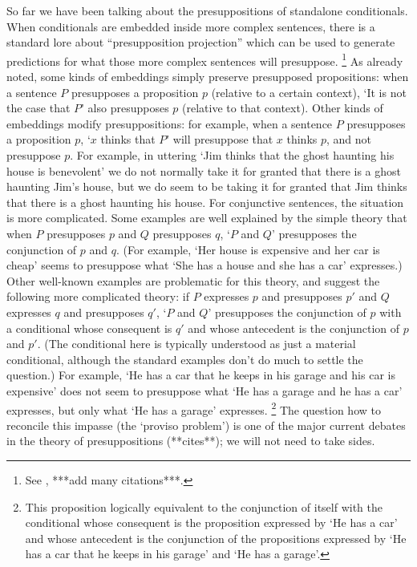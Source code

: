 \documentclass[If.tex]{subfiles}
\begin{document}
So far we have been talking about the presuppositions of standalone conditionals. When conditionals are embedded inside more complex sentences, there is a standard lore about “presupposition projection” which can be used to generate predictions for what those more complex sentences will presuppose.%
\footnote{See \cite{KarttunenPetersCI}, ***add many citations***.} 
As already noted, some kinds of embeddings simply preserve presupposed propositions: when a sentence $P$ presupposes a proposition $p$ (relative to a certain context), ‘It is not the case that $P$’ also presupposes $p$ (relative to that context). Other kinds of embeddings modify presuppositions: for example, when a sentence $P$ presupposes a proposition $p$, ‘$x$ thinks that $P$’ will presuppose that $x$ thinks $p$, and not presuppose $p$.  For example, in uttering ‘Jim thinks that the ghost haunting his house is benevolent’ we do not normally take it for granted that there is a ghost haunting Jim's house, but we do seem to be taking it for granted that Jim thinks that there is a ghost haunting his house.  For conjunctive sentences, the situation is more complicated.  Some examples are well explained by the simple theory that when $P$ presupposes $p$ and $Q$ presupposes $q$, ‘$P$ and $Q$’ presupposes the conjunction of $p$ and $q$.  (For example, ‘Her house is expensive and her car is cheap’ seems to presuppose what ‘She has a house and she has a car’ expresses.)  Other well-known examples are problematic for this theory, and suggest the following more complicated theory: if $P$ expresses $p$ and presupposes $p'$ and $Q$ expresses $q$ and presupposes $q'$, ‘$P$ and $Q$’ presupposes the conjunction of $p$ with a conditional whose consequent is $q'$ and whose antecedent is the conjunction of $p$ and $p'$.  (The conditional here is typically understood as just a material conditional, although the standard examples don't do much to settle the question.)  For example, ‘He has a car that he keeps in his garage and his car is expensive’ does not seem to presuppose what ‘He has a garage and he has a car’ expresses, but only what ‘He has a garage’ expresses.%
\footnote{This proposition logically equivalent to the conjunction of itself with the conditional whose consequent is the proposition expressed by ‘He has a car’ and whose antecedent is the conjunction of the propositions expressed by ‘He has a car that he keeps in his garage’ and ‘He has a garage’.}
The question how to reconcile this impasse (the ‘proviso problem’) is one of the major current debates in the theory of presuppositions (**cites**); we will not need to take sides.  
\end{document}
